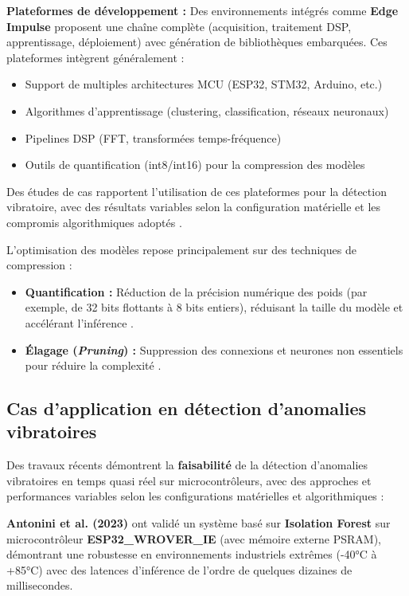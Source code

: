 \textbf{Plateformes de développement :} Des environnements intégrés comme \textbf{Edge Impulse} proposent une chaîne complète (acquisition, traitement DSP, apprentissage, déploiement) avec génération de bibliothèques embarquées. Ces plateformes intègrent généralement :

\begin{itemize}
\item Support de multiples architectures MCU (ESP32, STM32, Arduino, etc.)
\item Algorithmes d'apprentissage (clustering, classification, réseaux neuronaux)
\item Pipelines DSP (FFT, transformées temps-fréquence)
\item Outils de quantification (int8/int16) pour la compression des modèles
\end{itemize}

Des études de cas rapportent l'utilisation de ces plateformes pour la détection vibratoire, avec des résultats variables selon la configuration matérielle et les compromis algorithmiques adoptés \cite{arciniegas2025}.

L'optimisation des modèles repose principalement sur des techniques de compression :
\begin{itemize}
\item \textbf{Quantification :} Réduction de la précision numérique des poids (par exemple, de 32 bits flottants à 8 bits entiers), réduisant la taille du modèle et accélérant l'inférence \cite{arciniegas2025,langer2025}.
\item \textbf{Élagage (\textit{Pruning}) :} Suppression des connexions et neurones non essentiels pour réduire la complexité \cite{tsoukas2024}.
\end{itemize}

\subsection{Cas d'application en détection d'anomalies vibratoires}

Des travaux récents démontrent la \textbf{faisabilité} de la détection d'anomalies vibratoires en temps quasi réel sur microcontrôleurs, avec des approches et performances variables selon les configurations matérielles et algorithmiques :

\textbf{Antonini et al. (2023)} \cite{antonini2023} ont validé un système basé sur \textbf{Isolation Forest} sur microcontrôleur \textbf{ESP32\_WROVER\_IE} (avec mémoire externe PSRAM), démontrant une robustesse en environnements industriels extrêmes (-40°C à +85°C) avec des latences d'inférence de l'ordre de quelques dizaines de millisecondes.


